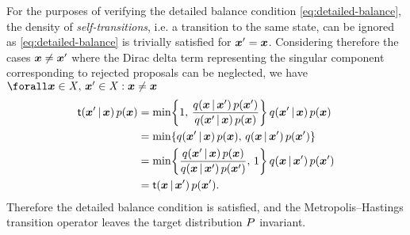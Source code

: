 For the purposes of verifying the detailed balance condition \eqref{eq:detailed-balance}, the density of \emph{self-transitions}, i.e. a transition to the same state, can be ignored as \eqref{eq:detailed-balance} is trivially satisfied for $\boldsymbol{x}' = \boldsymbol{x}$. Considering therefore the cases $\boldsymbol{x} \neq \boldsymbol{x}'$ where the Dirac delta term representing the singular component corresponding to rejected proposals can be neglected, we have $\forall \vct{x} \in \set{X},\,\vct{x}' \in \set{X} : \vct{x} \neq \vct{x}$
\begin{align}\label{eq:metropolis-hastings-detailed-balance-derivation}
  \trans(\vct{x}'\gvn\vct{x})\,\tgtdens(\vct{x}) &=
  \min\lbr 
    1,\, 
    \frac
      {q(\vct{x}\gvn\vct{x}')\,\tgtdens(\vct{x}')}
      {q(\vct{x}'\gvn\vct{x})\,\tgtdens(\vct{x})} 
  \rbr\,
  q(\vct{x}'\gvn \vct{x})\,\tgtdens(\vct{x})
  \\
  &=
  \min\lbr 
    q(\vct{x}'\gvn \vct{x})\,\tgtdens(\vct{x}),\, 
    q(\vct{x}\gvn\vct{x}')\,\tgtdens(\vct{x}')
  \rbr
  \\
  &=
  \min\lbr 
    \frac
      {q(\vct{x}'\gvn\vct{x})\,\tgtdens(\vct{x})}
      {q(\vct{x}\gvn\vct{x}')\,\tgtdens(\vct{x}')} 
    ,\, 1
  \rbr\,
  q(\vct{x}\gvn \vct{x}')\,\tgtdens(\vct{x}')
  \\
  &=
  \trans(\vct{x}\gvn\vct{x}')\,\tgtdens(\vct{x}').
\end{align}
Therefore the detailed balance condition is satisfied, and the Metropolis--Hastings transition operator leaves the target distribution $P$ invariant.

